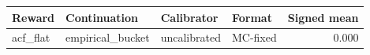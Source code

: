 \begin{tabular}{llllr}
\toprule
Reward & Continuation & Calibrator & Format & Signed mean \\
\midrule
acf\_flat & empirical\_bucket & uncalibrated & MC-fixed & 0.000 \\
\bottomrule
\end{tabular}